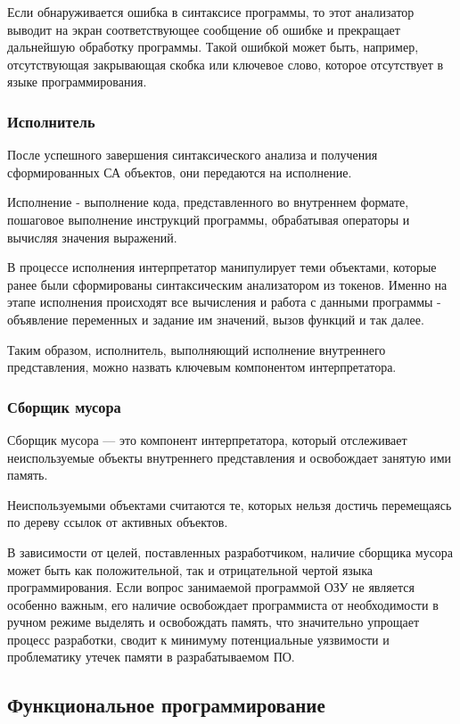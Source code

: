 Если обнаруживается ошибка в синтаксисе программы, то этот анализатор выводит на экран соответствующее сообщение об ошибке и прекращает дальнейшую обработку программы. Такой ошибкой может быть, например, отсутствующая закрывающая скобка или ключевое слово, которое отсутствует в языке программирования.



\subsubsection{Исполнитель}

После успешного завершения синтаксического анализа и получения сформированных СА объектов, они передаются на исполнение.

Исполнение - выполнение кода, представленного во внутреннем формате, пошаговое выполнение инструкций программы, обрабатывая операторы и вычисляя значения выражений.

В процессе исполнения интерпретатор манипулирует теми объектами, которые ранее были сформированы синтаксическим анализатором из токенов. Именно на этапе исполнения происходят все вычисления и работа с данными программы - объявление переменных и задание им значений, вызов функций и так далее.

Таким образом, исполнитель, выполняющий исполнение внутреннего представления, можно назвать ключевым компонентом интерпретатора.


\subsubsection{Сборщик мусора}
Сборщик мусора — это компонент интерпретатора, который отслеживает неиспользуемые объекты внутреннего представления и освобождает занятую ими память.

Неиспользуемыми объектами считаются те, которых нельзя достичь перемещаясь по дереву ссылок от активных объектов.

В зависимости от целей, поставленных разработчиком, наличие сборщика мусора может быть как положительной, так и отрицательной чертой языка программирования. Если вопрос занимаемой программой ОЗУ не является особенно важным, его наличие освобождает программиста от необходимости в ручном режиме выделять и освобождать память, что значительно упрощает процесс разработки, сводит к минимуму потенциальные уязвимости и проблематику утечек памяти в разрабатываемом ПО.


\subsection{Функциональное программирование}

